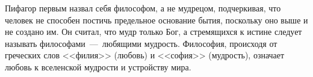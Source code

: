 
Пифагор первым назвал себя философом, а не мудрецом, подчеркивая, что человек не способен постичь предельное основание бытия, поскольку оно выше и не создано им. Он считал, что мудр только Бог, а стремящихся к истине следует называть философами~---~любящими мудрость. Философия, происходя от греческих слов <<филия>> (любовь) и <<софия>> (мудрость), означает любовь к вселенской мудрости и устройству мира.

